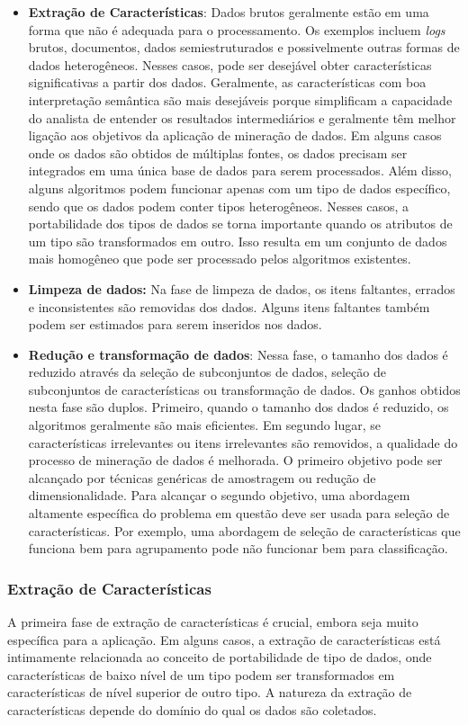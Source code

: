 \begin{itemize}
  \item
\textbf{Extração de Características}: Dados brutos geralmente estão em uma forma que não é adequada para o processamento. Os exemplos incluem \textit{logs} brutos, documentos, dados semiestruturados e possivelmente outras formas de dados heterogêneos. Nesses casos, pode ser desejável obter características significativas a partir dos dados. Geralmente, as características com boa interpretação semântica são mais desejáveis porque simplificam a capacidade do analista de entender os resultados intermediários e geralmente têm melhor ligação aos objetivos da aplicação de mineração de dados. Em alguns casos onde os dados são obtidos de múltiplas fontes, os dados precisam ser integrados em uma única base de dados para serem processados. Além disso, alguns algoritmos podem funcionar apenas com um tipo de dados específico, sendo que os dados podem conter tipos heterogêneos. Nesses casos, a portabilidade dos tipos de dados se torna importante quando os atributos de um tipo são transformados em outro. Isso resulta em um conjunto de dados mais homogêneo que pode ser processado pelos algoritmos existentes.
  \item
\textbf{Limpeza de dados:} Na fase de limpeza de dados, os itens faltantes, errados e inconsistentes são removidas dos dados. Alguns itens faltantes também podem ser estimados para serem inseridos nos dados.
  \item
\textbf{Redução e transformação de dados}: Nessa fase, o tamanho dos dados é reduzido através da seleção de subconjuntos de dados, seleção de subconjuntos de características ou transformação de dados. Os ganhos obtidos nesta fase são duplos. Primeiro, quando o tamanho dos dados é reduzido, os algoritmos geralmente são mais eficientes. Em segundo lugar, se características irrelevantes ou itens irrelevantes são removidos, a qualidade do processo de mineração de dados é melhorada. O primeiro objetivo pode ser alcançado por técnicas genéricas de amostragem ou redução de dimensionalidade. Para alcançar o segundo objetivo, uma abordagem altamente específica do problema em questão deve ser usada para seleção de características. Por exemplo, uma abordagem de seleção de características que funciona bem para agrupamento pode não funcionar bem para classificação.
\end{itemize}

\subsubsection{Extração de Características}
A primeira fase de extração de características é crucial, embora seja muito específica para a aplicação. Em alguns casos, a extração de características está intimamente relacionada ao conceito de portabilidade de tipo de dados, onde características de baixo nível de um tipo podem ser transformados em características de nível superior de outro tipo. A natureza da extração de características depende do domínio do qual os dados são coletados.

